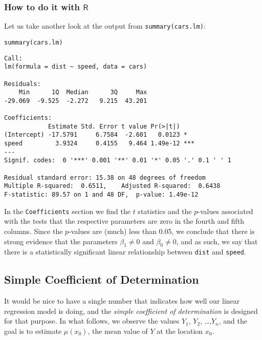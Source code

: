 \subsubsection{How to do it with \(\mathsf{R}\)}
\label{sec-11-3-1-1}

Let us take another look at the output from \texttt{summary(cars.lm)}:

\begin{verbatim}
summary(cars.lm)
\end{verbatim}

\begin{verbatim}
Call:
lm(formula = dist ~ speed, data = cars)

Residuals:
    Min      1Q  Median      3Q     Max 
-29.069  -9.525  -2.272   9.215  43.201 

Coefficients:
            Estimate Std. Error t value Pr(>|t|)    
(Intercept) -17.5791     6.7584  -2.601   0.0123 *  
speed         3.9324     0.4155   9.464 1.49e-12 ***
---
Signif. codes:  0 '***' 0.001 '**' 0.01 '*' 0.05 '.' 0.1 ' ' 1

Residual standard error: 15.38 on 48 degrees of freedom
Multiple R-squared:  0.6511,	Adjusted R-squared:  0.6438 
F-statistic: 89.57 on 1 and 48 DF,  p-value: 1.49e-12
\end{verbatim}

In the \texttt{Coefficients} section we find the \(t\) statistics and the
\(p\)-values associated with the tests that the respective parameters
are zero in the fourth and fifth columns. Since the \(p\)-values are
(much) less than 0.05, we conclude that there is strong evidence that
the parameters \(\beta_{1}\neq0\) and \(\beta_{0}\neq0\), and as such,
we say that there is a statistically significant linear relationship
between \texttt{dist} and \texttt{speed}.

\subsection{Simple Coefficient of Determination}
\label{sec-11-3-2}

It would be nice to have a single number that indicates how well our
linear regression model is doing, and the \emph{simple coefficient of
determination} is designed for that purpose. In what follows, we
observe the values \(Y_{1}\), \(Y_{2}\), \ldots{},\(Y_{n}\), and the goal
is to estimate \(\mu(x_{0})\), the mean value of \(Y\) at the location
\(x_{0}\).

